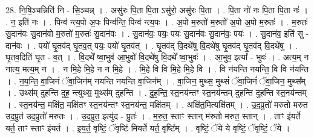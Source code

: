 \documentclass[17pt]{extarticle}
\begin{document}
28. नि॒षि॒ञ्चन्निति॑ नि - सि॒ञ्चन्न् । . असु॑रः पि॒ता पि॒ता ऽसु॑रो॒ असु॑रः पि॒ता । . पि॒ता नो॑ नः पि॒ता पि॒ता नः॑ । . न॒ इति॑ नः । . पिन्व॑ न्त्य॒पो अ॒पः पिन्व॑न्ति॒ पिन्व॑ न्त्य॒पः । . अ॒पो म॒रुतो॑ म॒रुतो॑ अ॒पो अ॒पो म॒रुतः॑ । . म॒रुतः॑ सु॒दान॑वः सु॒दान॑वो म॒रुतो॑ म॒रुतः॑ सु॒दान॑वः । . सु॒दान॑वः॒ पयः॒ पयः॑ सु॒दान॑वः सु॒दान॑वः॒ पयः॑ । . सु॒दान॑व॒ इति॑ सु - दान॑वः । . पयो॑ घृ॒तव॑द् घृ॒तव॒त् पयः॒ पयो॑ घृ॒तव॑त् । . घृ॒तव॑द् वि॒दथे॑षु वि॒दथे॑षु घृ॒तव॑द् घृ॒तव॑द् वि॒दथे॑षु । . घृ॒तव॒दिति॑ घृ॒त - व॒त् । . वि॒दथे᳚ ष्वा॒भुव॑ आ॒भुवो॑ वि॒दथे॑षु वि॒दथे᳚ ष्वा॒भुवः॑ । . आ॒भुव॒ इत्या᳚ - भुवः॑ । . अत्य॒म् न नात्य॒ मत्य॒म् न । . न मि॒हे मि॒हे न न मि॒हे । . मि॒हे वि वि मि॒हे मि॒हे वि । . वि न॑यन्ति नयन्ति॒ वि वि न॑यन्ति । . न॒य॒न्ति॒ वा॒जिनं॑ ॅवा॒जिन॑म् नयन्ति नयन्ति वा॒जिन᳚म् । . वा॒जिन॒ मुथ्स॒ मुथ्सं॑ ॅवा॒जिनं॑ ॅवा॒जिन॒ मुथ्स᳚म् । . उथ्स॑म् दुहन्ति दुह॒ न्त्युथ्स॒ मुथ्स॑म् दुहन्ति । . दु॒ह॒न्ति॒ स्त॒नय॑न्तꣳ स्त॒नय॑न्तम् दुहन्ति दुहन्ति स्त॒नय॑न्तम् । . स्त॒नय॑न्त॒ मक्षि॑त॒ मक्षि॑तꣳ स्त॒नय॑न्तꣳ स्त॒नय॑न्त॒ मक्षि॑तम् । . अक्षि॑त॒मित्यक्षि॑तम् । . उ॒द॒प्रुतो॑ मरुतो मरुत उद॒प्रुत॑ उद॒प्रुतो॑ मरुतः । . उ॒द॒प्रुत॒ इत्यु॑द - प्रुतः॑ । . म॒रु॒त॒ स्ताꣳ स्तान् म॑रुतो मरुत॒ स्तान् । . ताꣳ इ॑यर्ते यर्त॒ ताꣳ स्ताꣳ इ॑यर्त । . इ॒य॒र्त॒ वृष्टिं॒ ॅवृष्टि॑ मियर्ते यर्त॒ वृष्टि᳚म् । . वृष्टिं॒ ॅये ये वृष्टिं॒ ॅवृष्टिं॒ ॅये । \newline
\end{document}
